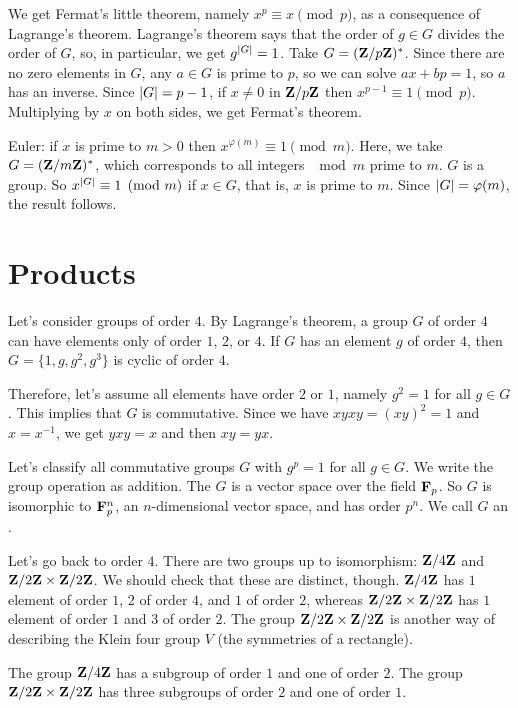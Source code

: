 \documentclass[11pt, twoside]{amsart}
\begin{document}
We get Fermat's little theorem, namely $x^p \equiv x\pmod p$, as a consequence of Lagrange's theorem. Lagrange's theorem says that the order of $g\in G$ divides the order of $G$, so, in particular, we get $g^{\left \lvert G \right \rvert} = 1$. Take $G = (\mathbf{Z}/p\mathbf{Z})^*$. Since there are no zero elements in $G$, any $a\in G$ is prime to $p$, so we can solve $ax + bp = 1$, so $a$ has an inverse. Since $\left \lvert G \right \rvert = p-1$, if $x\neq 0$ in $\mathbf{Z}/p\mathbf{Z}$ then $x^{p-1} \equiv 1 \pmod p$. Multiplying by $x$ on both sides, we get Fermat's theorem.

Euler: if $x$ is prime to $m>0$ then $x^{\varphi( m)} \equiv 1\pmod m$. Here, we take $G = (\mathbf{Z}/m\mathbf{Z})^*$, which corresponds to all integers $\mod m $ prime to $m$. $G$ is a group. So $x^{\left \lvert G \right \rvert} \equiv 1\pmod m$ if $x\in G$, that is, $x$ is prime to $m$. Since $\left \lvert G \right \rvert = \varphi (m)$, the result follows.
 
\section{Products}
Let's consider groups of order $4$. By Lagrange's theorem, a group $G$ of order $4$ can have elements only of order $1$, $2$, or $4$. If $G$ has an element $g$ of order $4$, then $G = \{1,g,g^2, g^3\}$ is cyclic of order $4$. 

Therefore, let's assume all elements have order $2$ or $1$, namely $g^2=1$ for all $g\in G$. This implies that $G$ is commutative. Since we have $xyxy = (xy)^2 = 1$ and $x = x^{-1}$, we get $yxy=x$ and then $xy = yx$.

Let's classify all commutative groups $G$ with $g^p=1$ for all $g\in G$. We write the group operation as addition. The $G$ is a vector space over the field $\mathbf F_p$. So $G$ is isomorphic to $\mathbf F_p^n$, an $n$-dimensional vector space, and has order $p^n$. We call $G$ an . 

Let's go back to order $4$. There are two groups up to isomorphism: $\mathbf{Z}/4\mathbf{Z}$ and $\mathbf{Z}/2\mathbf{Z}\times \mathbf{Z}/2\mathbf{Z}$. We should check that these are distinct, though. $\mathbf{Z}/4\mathbf{Z}$ has $1$ element of order $1$, $2$ of order $4$, and $1$ of order $2$, whereas $\mathbf{Z}/2\mathbf{Z}\times \mathbf{Z}/2\mathbf{Z}$ has $1$ element of order $1$ and $3$ of order $2$. The group $\mathbf{Z}/2\mathbf{Z}\times \mathbf{Z}/2\mathbf{Z}$ is another way of describing the Klein four group $V$ (the symmetries of a rectangle). 

The group $\mathbf{Z}/4\mathbf{Z}$ has a subgroup of order $1$ and one of order $2$. The group $\mathbf{Z}/2\mathbf{Z}\times \mathbf{Z}/2\mathbf{Z}$ has three subgroups of order $2$ and one of order $1$. 
\end{document}
